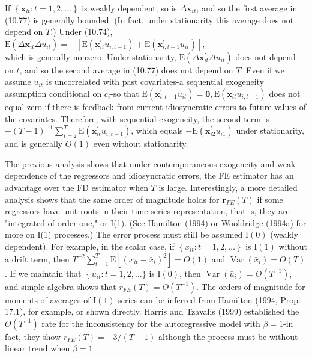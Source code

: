 \documentclass[10pt]{article}
\begin{document}
If $\left\{\mathbf{x}_{i t}: t=1,2, \ldots\right\}$ is weakly dependent, so is $\Delta \mathbf{x}_{i t}$, and so the first average in (10.77) is generally bounded. (In fact, under stationarity this average does not depend on $T$.) Under (10.74),\\
$\mathrm{E}\left(\Delta \mathbf{x}_{i t}^{\prime} \Delta u_{i t}\right)=-\left[\mathrm{E}\left(\mathbf{x}_{i t}^{\prime} u_{i, t-1}\right)+\mathrm{E}\left(\mathbf{x}_{i, t-1}^{\prime} u_{i t}\right)\right]$,\\
which is generally nonzero. Under stationarity, $\mathrm{E}\left(\Delta \mathbf{x}_{i t}^{\prime} \Delta u_{i t}\right)$ does not depend on $t$, and so the second average in (10.77) does not depend on $T$. Even if we assume $u_{i t}$ is uncorrelated with past covariates-a sequential exogeneity assumption conditional on $c_{i}$-so that $\mathrm{E}\left(\mathbf{x}_{i, t-1}^{\prime} u_{i t}\right)=\mathbf{0}, \mathrm{E}\left(\mathbf{x}_{i t}^{\prime} u_{i, t-1}\right)$ does not equal zero if there is feedback from current idiosyncratic errors to future values of the covariates. Therefore, with sequential exogeneity, the second term is $-(T-1)^{-1} \sum_{t=2}^{T} \mathrm{E}\left(\mathbf{x}_{i t}^{\prime} u_{i, t-1}\right)$, which equals $-\mathrm{E}\left(\mathbf{x}_{i 2}^{\prime} u_{i 1}\right)$ under stationarity, and is generally $O(1)$ even without stationarity.

The previous analysis shows that under contemporaneous exogeneity and weak dependence of the regressors and idiosyncratic errors, the FE estimator has an\\
advantage over the FD estimator when $T$ is large. Interestingly, a more detailed analysis shows that the same order of magnitude holds for $\mathbf{r}_{F E}(T)$ if some regressors have unit roots in their time series representation, that is, they are "integrated of order one," or I(1). (See Hamilton (1994) or Wooldridge (1994a) for more on I(1) processes.) The error process must still be assumed $\mathrm{I}(0)$ (weakly dependent). For example, in the scalar case, if $\left\{x_{i t}: t=1,2, \ldots\right\}$ is $\mathrm{I}(1)$ without a drift term, then $T^{-2} \sum_{t=1}^{T} \mathrm{E}\left[\left(x_{i t}-\bar{x}_{i}\right)^{2}\right]=O(1)$ and $\operatorname{Var}\left(\bar{x}_{i}\right)=O(T)$. If we maintain that $\left\{u_{i t}: t=\right. 1,2, \ldots\}$ is $\mathrm{I}(0)$, then $\operatorname{Var}\left(\bar{u}_{i}\right)=O\left(T^{-1}\right)$, and simple algebra shows that $r_{F E}(T)= O\left(T^{-1}\right)$. The orders of magnitude for moments of averages of $\mathrm{I}(1)$ series can be inferred from Hamilton (1994, Prop. 17.1), for example, or shown directly. Harris and Tzavalis (1999) established the $O\left(T^{-1}\right)$ rate for the inconsistency for the autoregressive model with $\beta=1$-in fact, they show $r_{F E}(T)=-3 /(T+1)$-although the process must be without linear trend when $\beta=1$.
\end{document}
